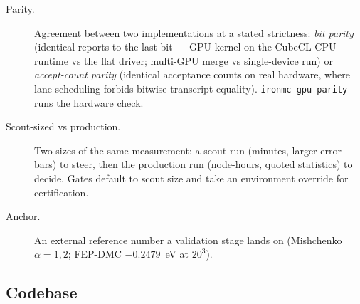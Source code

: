 \documentclass[11pt]{article}
\newcommand{\term}[1]{\item[#1.]}
\begin{document}
\begin{description}
\term{Parity} Agreement between two implementations at a stated strictness:
  \emph{bit parity} (identical reports to the last bit --- GPU kernel on the CubeCL
  CPU runtime vs the flat driver; multi-GPU merge vs single-device run) or
  \emph{accept-count parity} (identical acceptance counts on real hardware, where
  lane scheduling forbids bitwise transcript equality). \texttt{ironmc gpu parity}
  runs the hardware check.

\term{Scout-sized vs production} Two sizes of the same measurement: a scout run
  (minutes, larger error bars) to steer, then the production run (node-hours, quoted
  statistics) to decide. Gates default to scout size and take an environment override
  for certification.

\term{Anchor} An external reference number a validation stage lands on (Mishchenko
  $\alpha=1,2$; FEP-DMC $-0.2479$~eV at $20^{3}$).
\end{description}

\subsection{Codebase}
\end{document}
